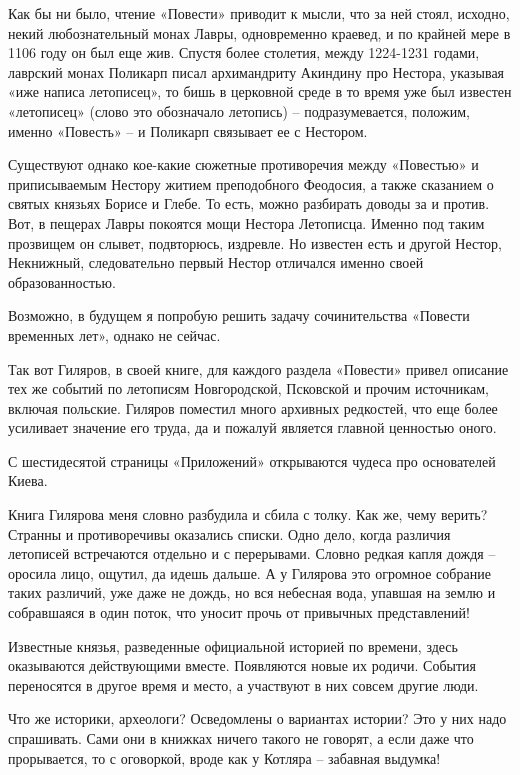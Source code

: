 Как бы ни было, чтение «Повести» приводит к мысли, что за ней стоял, исходно, некий любознательный монах Лавры, одновременно краевед, и по крайней мере в 1106 году он был еще жив. Спустя более столетия, между 1224-1231 годами, лаврский монах Поликарп писал архимандриту Акиндину про Нестора, указывая «иже написа летописец», то бишь в церковной среде в то время уже был известен «летописец» (слово это обозначало летопись) – подразумевается, положим, именно «Повесть» – и Поликарп связывает ее с Нестором.

Существуют однако кое-какие сюжетные противоречия между «Повестью» и приписываемым Нестору житием преподобного Феодосия, а также сказанием о святых князьях Борисе и Глебе. То есть, можно разбирать доводы за и против. Вот, в пещерах Лавры покоятся мощи Нестора Летописца. Именно под таким прозвищем он слывет, подвторюсь, издревле. Но известен есть и другой Нестор, Некнижный, следовательно первый Нестор отличался именно своей образованностью. 

Возможно, в будущем я попробую решить задачу сочинительства «Повести временных лет», однако не сейчас.
 
Так вот Гиляров, в своей книге, для каждого раздела «Повести» привел описание тех же событий по летописям Новгородской, Псковской и прочим источникам, включая польские. Гиляров поместил много архивных редкостей, что еще более усиливает значение его труда, да и пожалуй является главной ценностью оного.

С шестидесятой страницы «Приложений» открываются чудеса про основателей Киева.

Книга Гилярова меня словно разбудила и сбила с толку. Как же, чему верить? Странны и противоречивы оказались списки. Одно дело, когда различия летописей встречаются отдельно и с перерывами. Словно редкая капля дождя – оросила лицо, ощутил, да идешь дальше. А у Гилярова это огромное собрание таких различий, уже даже не дождь, но вся небесная вода, упавшая на землю и собравшаяся в один поток, что уносит прочь от привычных представлений!

Известные князья, разведенные официальной историей по времени, здесь оказываются действующими вместе. Появляются новые их родичи. События переносятся в другое время и место, а участвуют в них совсем другие люди. 

Что же историки, археологи? Осведомлены о вариантах истории? Это у них надо спрашивать. Сами они в книжках ничего такого не говорят, а если даже что прорывается, то с оговоркой, вроде как у Котляра – забавная выдумка!

